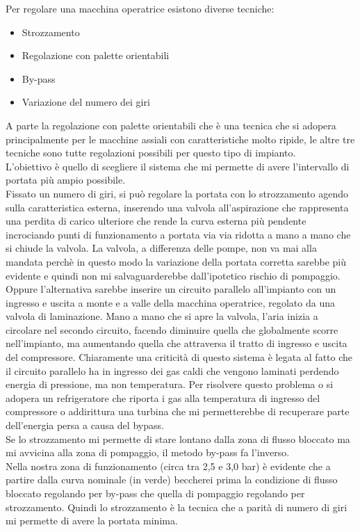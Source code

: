 \documentclass[a4paper, twoside, 12pt]{report}
\begin{document}
Per regolare una macchina operatrice esistono diverse tecniche:
\begin{itemize}
	\item Strozzamento
	\item Regolazione con palette orientabili
	\item By-pass
	\item Variazione del numero dei giri
\end{itemize}
A parte la regolazione con palette orientabili che è una tecnica che si adopera principalmente per le macchine assiali con caratteristiche molto ripide, le altre tre tecniche sono tutte regolazioni possibili per questo tipo di impianto.\\
L'obiettivo è quello di scegliere il sistema che mi permette di avere l'intervallo di portata più ampio possibile.\\
Fissato un numero di giri, si può regolare la portata con lo strozzamento agendo sulla caratteristica esterna, inserendo una valvola all'aspirazione che rappresenta una perdita di carico ulteriore che rende la curva esterna più pendente incrociando punti di funzionamento a portata via via ridotta a mano a mano che si chiude la valvola. La valvola, a differenza delle pompe, non va mai alla mandata perchè in questo modo la variazione della portata corretta sarebbe più evidente e quindi non mi salvaguarderebbe dall'ipotetico rischio di pompaggio.\\
Oppure l'alternativa sarebbe inserire un circuito parallelo all'impianto con un ingresso e uscita a monte e a valle della macchina operatrice, regolato da una valvola di laminazione.
Mano a mano che si apre la valvola, l'aria inizia a circolare nel secondo circuito, facendo diminuire quella che globalmente scorre nell'impianto, ma aumentando quella che attraversa il tratto di ingresso e uscita del compressore. Chiaramente una criticità di questo sistema è legata al fatto che il circuito parallelo ha in ingresso dei gas caldi che vengono laminati perdendo energia di pressione, ma non temperatura. Per risolvere questo problema o si adopera un refrigeratore che riporta i gas alla temperatura di ingresso del compressore o addirittura una turbina che mi permetterebbe di recuperare parte dell'energia persa a causa del bypass.\\
Se lo strozzamento mi permette di stare lontano dalla zona di flusso bloccato ma mi avvicina alla zona di pompaggio, il metodo by-pass fa l'inverso.\\
Nella nostra zona di funzionamento (circa tra 2,5 e 3,0 bar) è evidente che a partire dalla curva nominale (in verde) beccherei prima la condizione di flusso bloccato regolando per by-pass che quella di pompaggio regolando per strozzamento. Quindi lo strozzamento è la tecnica che a parità di numero di giri mi permette di avere la portata minima.\\
\end{document}
